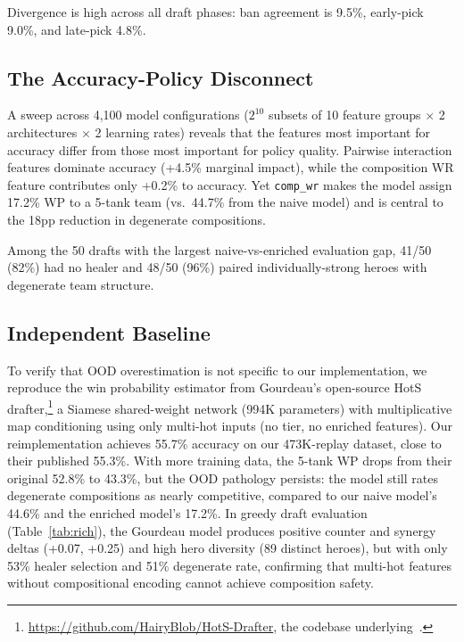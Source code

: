 \documentclass[journal]{IEEEtran}
\begin{document}
Divergence is high across all draft phases: ban agreement is 9.5\%, early-pick 9.0\%, and late-pick 4.8\%.

\subsection{The Accuracy-Policy Disconnect}

A sweep across 4,100 model configurations ($2^{10}$ subsets of 10 feature groups $\times$ 2 architectures $\times$ 2 learning rates) reveals that the features most important for accuracy differ from those most important for policy quality. Pairwise interaction features dominate accuracy (+4.5\% marginal impact), while the composition WR feature contributes only +0.2\% to accuracy. Yet \texttt{comp\_wr} makes the model assign 17.2\% WP to a 5-tank team (vs.\ 44.7\% from the naive model) and is central to the 18pp reduction in degenerate compositions.

Among the 50 drafts with the largest naive-vs-enriched evaluation gap, 41/50 (82\%) had no healer and 48/50 (96\%) paired individually-strong heroes with degenerate team structure.

\subsection{Independent Baseline}

To verify that OOD overestimation is not specific to our implementation, we reproduce the win probability estimator from Gourdeau's open-source HotS drafter,\footnote{\url{https://github.com/HairyBlob/HotS-Drafter}, the codebase underlying~\cite{gourdeau2021discriminative}.} a Siamese shared-weight network (994K parameters) with multiplicative map conditioning using only multi-hot inputs (no tier, no enriched features). Our reimplementation achieves 55.7\% accuracy on our 473K-replay dataset, close to their published 55.3\%. With more training data, the 5-tank WP drops from their original 52.8\% to 43.3\%, but the OOD pathology persists: the model still rates degenerate compositions as nearly competitive, compared to our naive model's 44.6\% and the enriched model's 17.2\%. In greedy draft evaluation (Table~\ref{tab:rich}), the Gourdeau model produces positive counter and synergy deltas (+0.07, +0.25) and high hero diversity (89 distinct heroes), but with only 53\% healer selection and 51\% degenerate rate, confirming that multi-hot features without compositional encoding cannot achieve composition safety.
\end{document}
